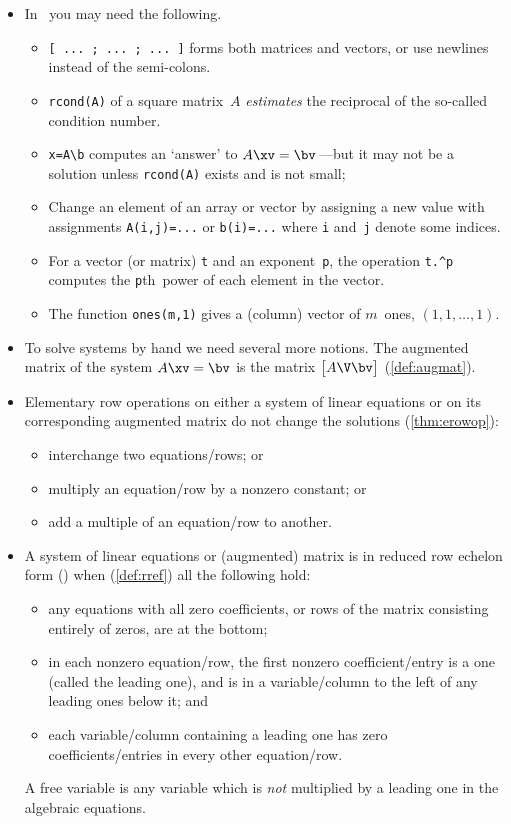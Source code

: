\begin{itemize}
\item In \script\ you may need the following.
\begin{itemize}
\item \verb|[ ... ; ... ; ... ]| forms both matrices and vectors, or use newlines instead of the semi-colons.
\item \verb|rcond(A)|  of a {square matrix}~\(A\) \emph{estimates} the reciprocal of the so-called {condition number}.
\item \verb|x=A\b| computes an `answer' to \(A\xv=\bv\)\,---but it may not be a solution unless \verb|rcond(A)| exists and is not small;
\item Change an element of an array or vector by assigning a new value with assignments \verb|A(i,j)=...| or \verb|b(i)=...| where \verb|i| and~\verb|j| denote some indices.
\item For a vector (or matrix) \verb|t| and an exponent~\verb|p|, the operation \verb|t.^p| computes the \verb|p|th~power of each element in the vector.
\item The function \verb|ones(m,1)| gives a (column) vector of \(m\)~ones, \((1,1,\ldots,1)\).
\end{itemize}



\item To solve systems by hand we need several more notions.
The {augmented matrix} of the {system} \(A\xv=\bv\) is the matrix \(\begin{bmatrix} A\V \bv \end{bmatrix}\)  (\autoref{def:augmat}).

\item {Elementary row operation}s on either a {system} of {linear equation}s or on its corresponding {augmented matrix} do not change the solutions (\autoref{thm:erowop}):
\begin{itemize}
\item interchange two equations\slash rows; or
\item multiply an equation\slash row by a nonzero constant; or
\item add a multiple of an equation\slash row to another.
\end{itemize}

\item A system of {linear equation}s or (augmented) matrix is in {reduced row echelon form} (\rref) when (\autoref{def:rref}) all the following hold:
  \begin{itemize}
\item any equations with all zero coefficients, or rows of the matrix consisting entirely of zeros, are at the bottom; 
\item in each nonzero equation\slash row, the first nonzero coefficient\slash entry is a one (called the {leading one}), and is in a variable\slash column to the left of any leading ones below it;
and
\item each variable\slash column containing a leading one has zero coefficients\slash entries in every other equation\slash row.\end{itemize}
A {free variable} is any variable which is \emph{not} multiplied by a {leading one} in the algebraic equations.


\end{itemize}
